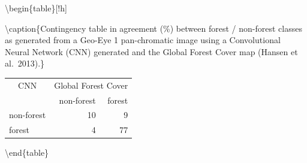 \documentclass[landscape]{article}
\begin{document}
\textbackslash{}begin\{table\}{[}!h{]}

\textbackslash{}caption\{\label{tab:unnamed-chunk-10}Contingency table
in agreement (\%) between forest / non-forest classes as generated from
a Geo-Eye 1 pan-chromatic image using a Convolutional Neural Network
(CNN) generated and the Global Forest Cover map (Hansen et al.~2013).\}
\centering

\begin{tabular}[t]{lrr}
\toprule
\multicolumn{1}{c}{CNN} & \multicolumn{2}{c}{Global Forest Cover} \\
\cmidrule(l{3pt}r{3pt}){1-1} \cmidrule(l{3pt}r{3pt}){2-3}
  & non-forest & forest\\
\midrule
non-forest & 10 & 9\\
forest & 4 & 77\\
\bottomrule
\end{tabular}

\textbackslash{}end\{table\}
\end{document}

